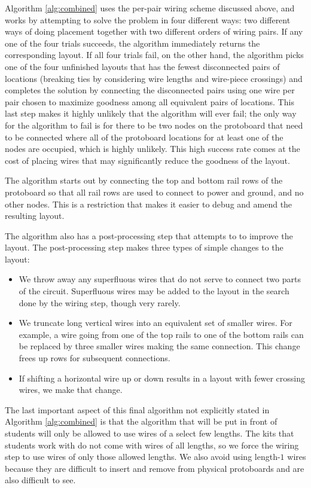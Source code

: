 Algorithm \ref{alg:combined} uses the per-pair wiring scheme discussed above,
and works by attempting to solve the problem in four different ways:
two different ways of doing placement together with two different orders of
wiring pairs. If any one of the four trials
succeeds, the algorithm immediately returns the corresponding layout. If all
four trials fail, on the other hand, the algorithm picks one of the four
unfinished layouts that has
the fewest disconnected pairs of locations (breaking ties by considering
wire lengths and
wire-piece crossings) and completes the solution by connecting the disconnected
pairs using one wire per pair chosen to maximize goodness among
all equivalent pairs of locations.
This last step makes
it highly unlikely that the algorithm will ever fail;
the only way for the algorithm to fail is for there to be two nodes on the
protoboard that need to be
connected where all of the protoboard locations for at least one of the nodes are
occupied, which is highly unlikely. This high success rate comes at the
cost of placing wires that may significantly reduce the goodness of the layout.

The algorithm starts out by connecting the top and bottom rail
rows of the protoboard
so that all rail rows are used to connect to power and ground, and no other
nodes. This is a restriction that makes it easier to debug and amend the
resulting layout.

The algorithm also has a post-processing step that attempts to to improve the
layout. The post-processing step makes three types of simple changes to the
layout:
\begin{itemize}
\item We throw away any superfluous wires that do not serve to connect
two parts of the circuit. Superfluous wires may be added to the layout
in the search done by the wiring step, though very rarely.
\item We truncate
long vertical wires into an equivalent set of smaller wires. For example, a wire
going from one of the top rails to one of the bottom rails can be replaced by
three smaller wires making the same connection. This change frees up rows for
subsequent connections.
\item If shifting a horizontal wire up or down
results in a layout with fewer crossing wires, we make that change.
\end{itemize}

The last important aspect of this final algorithm not explicitly stated in
Algorithm \ref{alg:combined} is that the algorithm that will be put
in front of students will only be allowed to use wires of a select few lengths.
The kits that students work with do not come with wires of all lengths,
so we force the wiring step to use wires of only those allowed lengths. We also
avoid using length-$1$ wires because they are difficult to insert and
remove from physical protoboards and are also difficult to see.

